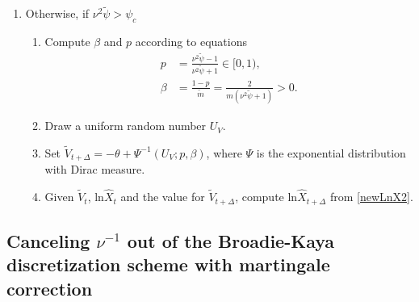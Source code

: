 \documentclass{ws-ijfe}
\begin{document}
\begin{enumerate}
\begin{enumerate}
\end{enumerate}
\item Otherwise, if $\nu^2\tilde{\psi}>\psi_c$
\begin{enumerate}
  \item Compute $\beta$ and $p$ according to equations
  \begin{align*}
    p & =\frac{\nu^2\tilde{\psi}-1}{\nu^2\tilde{\psi}+1}\in[0,1), \\
    \beta & =\frac{1-p}{\tilde{m}}=\frac{2}{m(\nu^2\tilde{\psi}+1)}>0.
  \end{align*}
  \item Draw a uniform random number $U_V$.
  \item Set $\tilde{V}_{t+\Delta}=-\theta+\Psi^{-1}(U_V;p,\beta)$, where $\Psi$ is the exponential distribution with Dirac measure.
 \item Given $\tilde{V}_t$, ln$\hat{X}_t$ and the value for $\tilde{V}_{t+\Delta}$, compute ln$\hat{X}_{t+\Delta}$ from \eqref{newLnX2}.
\end{enumerate}
\end{enumerate}

\subsection{Canceling $\nu^{-1}$ out of the Broadie-Kaya discretization scheme with martingale correction}

\end{document}
